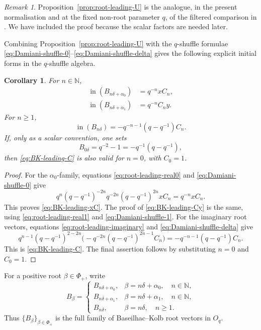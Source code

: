 \documentclass[11pt]{extarticle}
\newtheorem{corollary}[theorem]{Corollary}
\theoremstyle{definition}
\theoremstyle{remark}
\newtheorem{remark}[theorem]{Remark}
\numberwithin{equation}{section}
\newcommand{\N}{\mathbb N}
\newcommand{\Oq}{O_q}
\newcommand{\init}{\operatorname{in}}
\begin{document}
\begin{remark}
Proposition~\ref{prop:root-leading-U} is the analogue, in the present
normalisation and at the fixed non-root parameter \(q\), of the filtered
comparison in \cite[Proposition~4.4]{BaseilhacKolb2020}.  We have included
the proof because the scalar factors are needed later.
\end{remark}

Combining Proposition~\ref{prop:root-leading-U} with the \(q\)-shuffle
formulae \eqref{eq:Damiani-shuffle-0}--\eqref{eq:Damiani-shuffle-delta}
gives the following explicit initial forms in the \(q\)-shuffle algebra.

\begin{corollary}
\label{cor:root-leading-shuffle}
For \(n\in\N\),
\begin{align}
\init(B_{n\delta+\alpha_0})
 &=q^{-n}xC_n,
\label{eq:BK-leading-xC}\\
\init(B_{n\delta+\alpha_1})
 &=q^{-n}C_ny.
\label{eq:BK-leading-Cy}
\end{align}
For \(n\geq1\),
\begin{equation}
\label{eq:BK-leading-C}
        \init(B_{n\delta})
        =-q^{-n-1}(q-q^{-1})C_n .
\end{equation}
If, only as a scalar convention, one sets
\[
        B_{0\delta}=q^{-2}-1=-q^{-1}(q-q^{-1}),
\]
then \eqref{eq:BK-leading-C} is also valid for \(n=0\), with \(C_0=1\).
\end{corollary}

\begin{proof}
For the \(\alpha_0\)-family, equations
\eqref{eq:root-leading-real0} and \eqref{eq:Damiani-shuffle-0} give
\[
 q^n(q-q^{-1})^{-2n}
 q^{-2n}(q-q^{-1})^{2n}xC_n
 =
 q^{-n}xC_n.
\]
This proves \eqref{eq:BK-leading-xC}.  The proof of
\eqref{eq:BK-leading-Cy} is the same, using
\eqref{eq:root-leading-real1} and \eqref{eq:Damiani-shuffle-1}.  For the
imaginary root vectors, equations \eqref{eq:root-leading-imaginary} and
\eqref{eq:Damiani-shuffle-delta} give
\[
 q^{n-1}(q-q^{-1})^{2-2n}
 \bigl(-q^{-2n}(q-q^{-1})^{2n-1}C_n\bigr)
 =
 -q^{-n-1}(q-q^{-1})C_n.
\]
This is \eqref{eq:BK-leading-C}.  The final assertion follows by substituting
\(n=0\) and \(C_0=1\).
\end{proof}

For a positive root \(\beta\in\Phi_+\), write
\[
 B_\beta=
 \begin{cases}
 B_{n\delta+\alpha_0}, & \beta=n\delta+\alpha_0,\quad n\in\N,\\[1mm]
 B_{n\delta+\alpha_1}, & \beta=n\delta+\alpha_1,\quad n\in\N,\\[1mm]
 B_{n\delta}, & \beta=n\delta,\quad n\geq1.
 \end{cases}
\]
Thus \(\{B_\beta\}_{\beta\in\Phi_+}\) is the full family of
Baseilhac--Kolb root vectors in \(\Oq\).
\end{document}

